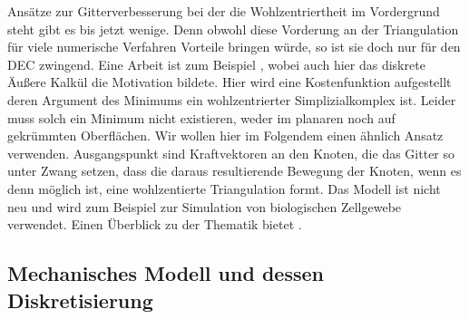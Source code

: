\begin{ziel}
    Ansätze zur Gitterverbesserung bei der die Wohlzentriertheit im Vordergrund steht gibt es bis jetzt wenige.
    Denn obwohl diese Vorderung an der Triangulation für viele numerische Verfahren Vorteile bringen würde, so ist sie doch nur für den DEC zwingend. 
    Eine Arbeit ist zum Beispiel \cite{meshHirani}, wobei auch hier das diskrete Äußere Kalkül die Motivation bildete.
    Hier wird eine Kostenfunktion aufgestellt deren Argument des Minimums ein wohlzentrierter Simplizialkomplex ist.
    Leider muss solch ein Minimum nicht existieren, weder im planaren noch auf gekrümmten Oberflächen.
    Wir wollen hier im Folgendem einen ähnlich Ansatz verwenden. 
    Ausgangspunkt sind Kraftvektoren an den Knoten, die das Gitter so unter Zwang setzen, dass die daraus resultierende Bewegung der Knoten, wenn es denn möglich ist, eine wohlzentierte Triangulation formt. 
    Das Modell ist nicht neu und wird zum Beispiel zur Simulation von biologischen Zellgewebe verwendet. 
    Einen Überblick zu der Thematik bietet \cite{meshCooper}.  
  \end{ziel}

  
  
  \subsection{Mechanisches Modell und dessen Diskretisierung}
    
